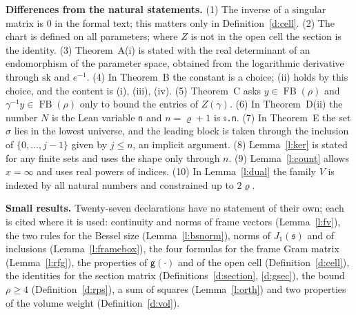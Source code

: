 \documentclass[11pt,a4paper]{article}
\theoremstyle{plainx}
\theoremstyle{uprightx}
\newcommand{\Jone}[1]{J_1(#1)}
\newcommand{\frbox}[1]{\operatorname{FB}(#1)}
\newcommand{\gd}[1]{\mathsf{g}(#1)}
\begin{document}
\textbf{Differences from the natural statements.} (1) The inverse of a singular matrix is $0$ in the formal text;
this matters only in Definition~\ref{d:cell}. (2) The chart is defined on all parameters; where $Z$ is not in the
open cell the section is the identity. (3) Theorem~A(i) is stated with the real determinant of an endomorphism of
the parameter space, obtained from the logarithmic derivative through $\mathrm{sk}$ and $e^{-1}$. (4) In Theorem~B
the constant is a choice; (ii) holds by this choice, and the content is (i), (iii), (iv). (5) Theorem~C asks
$y\in\frbox{\rho}$ and $\gamma^{-1}y\in\frbox{\rho}$ only to bound the entries of $Z(\gamma)$. (6) In Theorem~D(ii)
the number $N$ is the Lean variable \texttt{n} and $n=\varrho+1$ is \texttt{𝔰.n}. (7) In Theorem~E the set $\sigma$
lies in the lowest universe, and the leading block is taken through the inclusion of $\{0,\dots,j-1\}$ given by
$j\le n$, an implicit argument. (8) Lemma~\ref{l:ker} is stated for any finite sets and uses the shape only through
$n$. (9) Lemma~\ref{l:count} allows $x=\infty$ and uses real powers of indices. (10) In Lemma~\ref{l:dual} the
family $V$ is indexed by all natural numbers and constrained up to $2\varrho$.

\textbf{Small results.} Twenty-seven declarations have no statement of their own; each is cited where it is used:
continuity and norms of frame vectors (Lemma~\ref{l:fv}), the two rules for the Bessel size
(Lemma~\ref{l:bsnorm}), norms of $\Jone{\mathfrak{s}}$ and of inclusions (Lemma~\ref{l:framebox}), the four formulas
for the frame Gram matrix (Lemma~\ref{l:rfg}), the properties of $\gd{\cdot}$ and of the open cell
(Definition~\ref{d:cell}), the identities for the section matrix (Definitions~\ref{d:section}, \ref{d:gsec}), the
bound $\rho\ge4$ (Definition~\ref{d:rps}), a sum of squares (Lemma~\ref{l:orth}) and two properties of the volume
weight (Definition~\ref{d:vol}).
\end{document}
